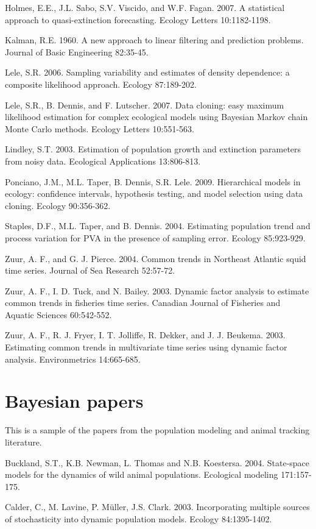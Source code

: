 Holmes, E.E., J.L. Sabo, S.V. Viscido, and W.F. Fagan. 2007. A statistical approach to quasi-extinction forecasting. Ecology Letters 10:1182-1198.

Kalman, R.E. 1960.  A new approach to linear filtering and prediction problems. Journal of Basic Engineering 82:35-45.

Lele, S.R. 2006. Sampling variability and estimates of density dependence: a composite likelihood approach.  Ecology 87:189-202.

Lele, S.R., B. Dennis, and F. Lutscher. 2007. Data cloning: easy maximum likelihood estimation for complex ecological models using Bayesian Markov chain Monte Carlo methods. Ecology Letters 10:551-563.

Lindley, S.T. 2003. Estimation of population growth and extinction parameters from noisy data. Ecological Applications 13:806-813.

Ponciano, J.M., M.L. Taper, B. Dennis, S.R. Lele. 2009. Hierarchical models in ecology: confidence intervals, hypothesis testing, and model selection using data cloning. Ecology 90:356-362.

Staples, D.F., M.L. Taper, and B. Dennis. 2004. Estimating population trend and process variation for PVA in the presence of sampling error. Ecology 85:923-929.

Zuur, A. F., and G. J. Pierce. 2004. Common trends in Northeast Atlantic squid time series. Journal of Sea Research 52:57-72.

Zuur, A. F., I. D. Tuck, and N. Bailey. 2003. Dynamic factor analysis to estimate common trends in fisheries time series. Canadian Journal of Fisheries and Aquatic Sciences 60:542-552.

Zuur, A. F., R. J. Fryer, I. T. Jolliffe, R. Dekker, and J. J. Beukema. 2003. Estimating common trends in multivariate time series using dynamic factor analysis. Environmetrics 14:665-685.

\section*{Bayesian papers}
This is a sample of the papers from the population modeling and animal tracking literature.
\bigskip

Buckland, S.T., K.B. Newman, L. Thomas and N.B. Koestersa. 2004. State-space models for the dynamics of wild animal populations. Ecological modeling 171:157-175.

Calder, C., M. Lavine, P. M{\"u}ller, J.S. Clark. 2003. Incorporating multiple sources of stochasticity into dynamic population models. Ecology 84:1395-1402.


